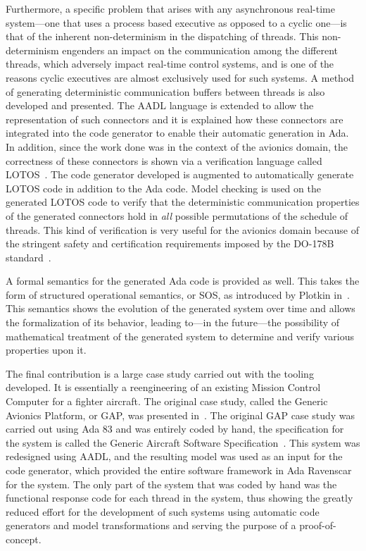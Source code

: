 Furthermore, a specific problem that arises with any asynchronous
real-time system---one that uses a process based executive as opposed
to a cyclic one---is that of the inherent non-determinism in the
dispatching of threads. This non-determinism engenders an impact on
the communication among the different threads, which adversely impact
real-time control systems, and is one of the reasons cyclic executives
are almost exclusively used for such systems. A method of generating
deterministic communication buffers between threads is also developed
and presented. The AADL language is extended to allow the
representation of such connectors and it is explained how these
connectors are integrated into the code generator to enable their
automatic generation in Ada. In addition, since the work done was in
the context of the avionics domain, the correctness of these
connectors is shown via a verification language called
LOTOS~\cite{garavel@cav07}. The code generator developed is augmented
to automatically generate LOTOS code in addition to the Ada
code. Model checking is used on the generated LOTOS code to verify
that the deterministic communication properties of the generated
connectors hold in \emph{all} possible permutations of the schedule of
threads. This kind of verification is very useful for the avionics
domain because of the stringent safety and certification requirements
imposed by the DO-178B standard~\cite{do178b}.

A formal semantics for the generated Ada code is provided as
well. This takes the form of structured operational semantics, or SOS,
as introduced by Plotkin in~\cite{plotkin-sos}. This semantics shows
the evolution of the generated system over time and allows the
formalization of its behavior, leading to---in the future---the
possibility of mathematical treatment of the generated system to
determine and verify various properties upon it.

The final contribution is a large case study carried out with the
tooling developed. It is essentially a reengineering of an existing
Mission Control Computer for a fighter aircraft. The original case
study, called the Generic Avionics Platform, or GAP, was presented
in~\cite{locke@rtss91, locke@irtaw90}. The original GAP case study was
carried out using Ada 83 and was entirely coded by hand, the
specification for the system is called the Generic Aircraft Software
Specification~\cite{locke@sei90}. This system was redesigned using
AADL, and the resulting model was used as an input for the code
generator, which provided the entire software framework in Ada
Ravenscar for the system. The only part of the system that was coded
by hand was the functional response code for each thread in the
system, thus showing the greatly reduced effort for the development of
such systems using automatic code generators and model transformations
and serving the purpose of a proof-of-concept.

